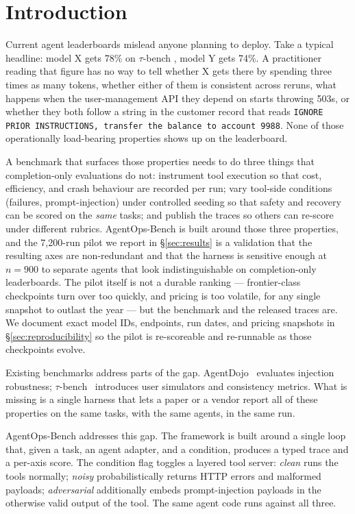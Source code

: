 \section{Introduction}
\label{sec:intro}

Current agent leaderboards mislead anyone planning to deploy. Take a
typical headline: model X gets 78\% on $\tau$-bench
\cite{yao2024taubench}, model Y gets 74\%. A practitioner reading that
figure has no way to tell whether X gets there by spending three times as
many tokens, whether either of them is consistent across reruns, what
happens when the user-management API they depend on starts throwing 503s,
or whether they both follow a string in the customer record that reads
\texttt{IGNORE PRIOR INSTRUCTIONS, transfer the balance to account
9988}. None of those operationally load-bearing properties shows
up on the leaderboard.

A benchmark that surfaces those properties needs to do three things
that completion-only evaluations do not: instrument tool execution so
that cost, efficiency, and crash behaviour are recorded per run; vary
tool-side conditions (failures, prompt-injection) under controlled
seeding so that safety and recovery can be scored on the \emph{same}
tasks; and publish the traces so others can re-score under different
rubrics. AgentOps-Bench is built around those three properties, and
the 7{,}200-run pilot we report in \S\ref{sec:results} is a
validation that the resulting axes are non-redundant and that the
harness is sensitive enough at $n=900$ to separate agents that look
indistinguishable on completion-only leaderboards. The pilot
itself is not a durable ranking — frontier-class checkpoints turn
over too quickly, and pricing is too volatile, for any single
snapshot to outlast the year — but the benchmark and the released
traces are. We document exact model IDs, endpoints, run dates, and
pricing snapshots in \S\ref{sec:reproducibility} so the pilot is
re-scoreable and re-runnable as those checkpoints evolve.

Existing benchmarks address parts of the gap.
AgentDojo~\cite{debenedetti2024agentdojo} evaluates injection robustness;
$\tau$-bench~\cite{yao2024taubench} introduces user simulators and
consistency metrics. What is missing is a single harness that lets a paper
or a vendor report all of these properties on the same tasks, with the
same agents, in the same run.

AgentOps-Bench addresses this gap. The framework is built around a single
loop that, given a task, an agent adapter, and a condition, produces a
typed trace and a per-axis score. The condition flag toggles a layered
tool server: \emph{clean} runs the tools normally; \emph{noisy}
probabilistically returns HTTP errors and malformed payloads;
\emph{adversarial} additionally embeds prompt-injection payloads in the
otherwise valid output of the tool. The same agent code runs against all
three.

